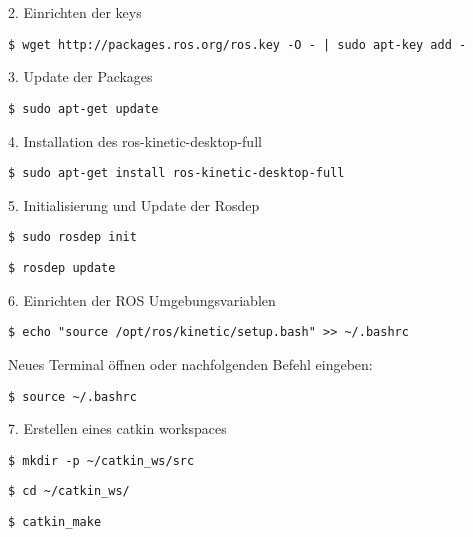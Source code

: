 2. Einrichten der keys\\

\begin{lstlisting}
$ wget http://packages.ros.org/ros.key -O - | sudo apt-key add -
\end{lstlisting}

3. Update der Packages\\

\begin{lstlisting}
$ sudo apt-get update
\end{lstlisting}

4. Installation des ros-kinetic-desktop-full\\

\begin{lstlisting}
$ sudo apt-get install ros-kinetic-desktop-full
\end{lstlisting}

5. Initialisierung und Update der Rosdep\\

\begin{lstlisting}
$ sudo rosdep init
\end{lstlisting}

\begin{lstlisting}
$ rosdep update
\end{lstlisting}

6. Einrichten der ROS Umgebungsvariablen\\

\begin{lstlisting}
$ echo "source /opt/ros/kinetic/setup.bash" >> ~/.bashrc
\end{lstlisting}

Neues Terminal öffnen oder nachfolgenden Befehl eingeben:\\

\begin{lstlisting}
$ source ~/.bashrc
\end{lstlisting}

7. Erstellen eines catkin workspaces \\

\begin{lstlisting}
$ mkdir -p ~/catkin_ws/src
\end{lstlisting}

\begin{lstlisting}
$ cd ~/catkin_ws/
\end{lstlisting}

\begin{lstlisting}
$ catkin_make
\end{lstlisting}

